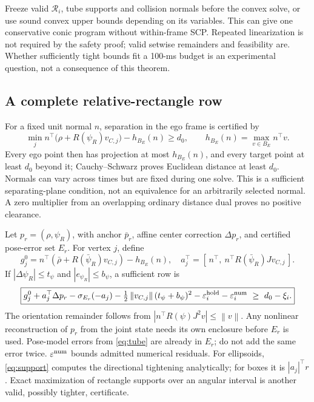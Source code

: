\documentclass[10pt,letterpaper]{article}
\newcommand{\norm}[1]{\left\lVert#1\right\rVert}
\newcommand{\supp}[2]{\sigma_{#1}(#2)}
\begin{document}
Freeze valid $\mathcal R_i$, tube supports and collision normals before the
convex solve, or use sound convex upper bounds depending on its variables.
This can give one conservative conic program without within-frame SCP.
Repeated linearization is not required by the safety proof; valid setwise
remainders and feasibility are. Whether sufficiently tight bounds fit a
100-ms budget is an experimental question, not a consequence of this theorem.

\subsection{A complete relative-rectangle row}
For a fixed unit normal $n$, separation in the ego frame is certified by
\begin{equation}\label{eq:plane}
\min_j n^\top\bigl(\rho+R(\psi_R)v_{C,j}\bigr)-h_{B_E}(n)\ge d_0,
\qquad h_{B_E}(n)=\max_{v\in B_E}n^\top v.
\end{equation}
Every ego point then has projection at most $h_{B_E}(n)$, and every target
point at least $d_0$ beyond it; Cauchy--Schwarz proves Euclidean distance at
least $d_0$. Normals can vary across times but are fixed during one solve.
This is a sufficient separating-plane condition, not an equivalence for an
arbitrarily selected normal. A zero multiplier from an overlapping ordinary
distance dual proves no positive clearance.

Let $p_r=(\rho,\psi_R)$, with anchor $\bar p_r$, affine center correction
$\Delta p_r$, and certified pose-error set $E_r$. For vertex $j$, define
\begin{equation}
g_j^0=n^\top(\bar\rho+R(\bar\psi_R)v_{C,j})-h_{B_E}(n),\quad
a_j^\top=[\,n^\top,\ n^\top R(\bar\psi_R)Jv_{C,j}\,].
\end{equation}
If $|\Delta\psi_R|\le t_\psi$ and $|e_{\psi_R}|\le b_\psi$, a sufficient row is
\begin{equation}\label{eq:robustRow}
\boxed{
g_j^0+a_j^\top\Delta p_r-\supp{E_r}{-a_j}
-\tfrac12\norm{v_{C,j}}(t_\psi+b_\psi)^2
-\varepsilon_i^{\rm hold}-\varepsilon_i^{\rm num}
\ \ge\ d_0-\xi_i.}
\end{equation}
The orientation remainder follows from
$|n^\top R(\psi)J^2v|\le\norm v$. Any nonlinear reconstruction of $p_r$ from
the joint state needs its own enclosure before $E_r$ is used. Pose-model errors
from \eqref{eq:tube} are already in $E_r$; do not add the same error twice.
$\varepsilon^{\rm num}$ bounds admitted numerical residuals. For ellipsoids,
\eqref{eq:support} computes the directional tightening analytically; for boxes
it is $|a_j|^\top r$. Exact maximization of rectangle supports over an angular
interval is another valid, possibly tighter, certificate.
\end{document}

